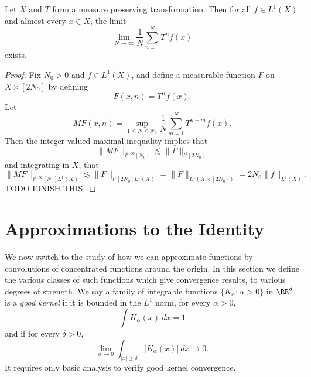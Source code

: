 \begin{theorem}
  Let $X$ and $T$ form a measure preserving transformation. Then for all $f \in L^1(X)$ and almost every $x \in X$, the limit
  \[ \lim_{N \to \infty} \frac{1}{N} \sum_{n = 1}^N T^n f(x) \]
  exists.
\end{theorem}
\begin{proof}
  Fix $N_0 > 0$ and $f \in L^1(X)$, and define a measurable function $F$ on $X \times [2N_0]$ by defining
  \[ F(x,n) = T^n f(x). \]
  Let
  \[ MF(x,n) = \sup_{1 \leq N \leq N_0} \frac{1}{N} \sum_{m = 1}^N T^{n+m} f(x). \]
  Then the integer-valued maximal inequality implies that
  \[ \| MF \|_{l^{1,\infty}[N_0]} \lesssim \| F \|_{l^1[2N_0]} \]
  and integrating in $X$, that
  \[ \| MF \|_{l^{1,\infty}[N_0] L^1(X)} \lesssim \| F \|_{l^1[2N_0] L^1(X)} = \| F \|_{L^1(X \times [2N_0])} = 2N_0 \| f \|_{L^1(X)}. \]
  TODO FINISH THIS.
\end{proof}

\section{Approximations to the Identity}

We now switch to the study of how we can approximate functions by convolutions of concentrated functions around the origin. In this section we define the various classes of such functions which give convergence results, to various degrees of strength. We say a family of integrable functions $\{ K_\alpha : \alpha > 0 \}$ in $\RR^d$ is a \emph{good kernel} if it is bounded in the $L^1$ norm, for every $\alpha > 0$,
%
\[ \int K_\alpha(x)\ dx = 1 \]
%
and if for every $\delta > 0$,
%
\[ \lim_{\alpha \to 0} \int_{|x| \geq \delta} |K_\alpha(x)|\ dx \to 0. \]
%
It requires only basic analysis to verify good kernel convergence.

